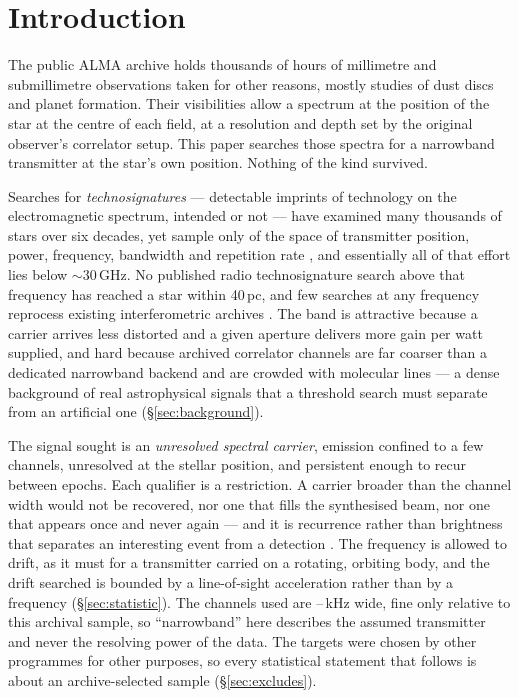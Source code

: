 \section{Introduction}
\label{sec:intro}

The public ALMA archive holds thousands of hours of millimetre and
submillimetre observations taken for other reasons, mostly studies of dust
discs and planet formation. Their visibilities allow a spectrum at the
position of the star at the centre of each field, at a resolution and depth
set by the original observer's correlator setup. This paper searches those
spectra for a narrowband transmitter at the star's own position. Nothing of
the kind survived.

Searches for \emph{technosignatures} --- detectable imprints of technology on
the electromagnetic spectrum, intended or not
\citep{Sheikh2020,SETIreview2025} --- have examined many thousands of stars
over six decades, yet sample only \HaystackFrac{} of the space of transmitter
position, power, frequency, bandwidth and repetition rate
\citep{Wright2018}, and essentially all of that effort lies below
${\sim}30$\,GHz. No published radio technosignature search above that
frequency has reached a star within 40\,pc, and few searches at any
frequency reprocess existing interferometric archives \citep{White2026}. The
band is attractive because a carrier arrives less distorted and a given
aperture delivers more gain per watt supplied, and hard because archived
correlator channels are far coarser than a dedicated narrowband backend and
are crowded with molecular lines --- a dense background of real
astrophysical signals that a threshold search must separate from an
artificial one (\S\ref{sec:background}).

The signal sought is an \emph{unresolved spectral carrier}, emission confined
to a few channels, unresolved at the stellar position, and persistent enough
to recur between epochs. Each qualifier is a restriction. A carrier broader
than the channel width would not be recovered, nor one that fills the
synthesised beam, nor one that appears once and never again --- and it is
recurrence rather than brightness that separates an interesting event from a
detection \citep{Sheikh2021}. The frequency is allowed to drift, as it must
for a transmitter carried on a rotating, orbiting body, and the drift
searched is bounded by a line-of-sight acceleration rather than by a
frequency (\S\ref{sec:statistic}). The channels used are
\ChanLoA--\ChanHiA\,kHz wide, fine only relative to this archival sample, so
``narrowband'' here describes the assumed transmitter and never the resolving
power of the data. The targets were chosen by other programmes for other
purposes, so every statistical statement that follows is about an
archive-selected sample (\S\ref{sec:excludes}).
